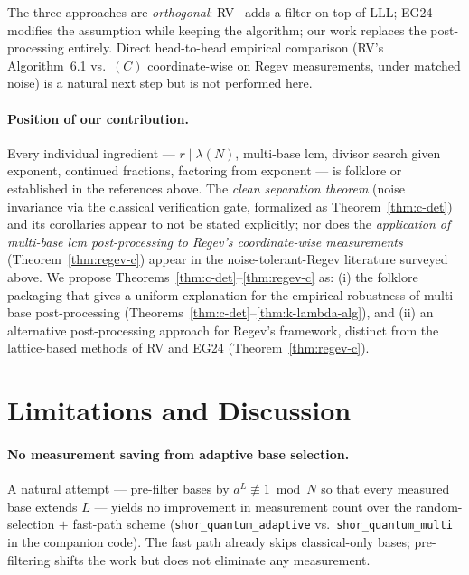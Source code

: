\documentclass[11pt]{article}
\begin{document}
The three approaches are \emph{orthogonal}: RV~\cite{ragavan2023} adds a filter on top of LLL; EG24~\cite{ekeragartner2024} modifies the assumption while keeping the algorithm; our work replaces the post-processing entirely. Direct head-to-head empirical comparison (RV's Algorithm~6.1 vs.\ $(C)$ coordinate-wise on Regev measurements, under matched noise) is a natural next step but is not performed here.

\paragraph{Position of our contribution.}
Every individual ingredient --- $r \mid \lambda(N)$, multi-base lcm, divisor search given exponent, continued fractions, factoring from exponent --- is folklore or established in the references above. The \emph{clean separation theorem} (noise invariance via the classical verification gate, formalized as Theorem~\ref{thm:c-det}) and its corollaries appear to not be stated explicitly; nor does the \emph{application of multi-base lcm post-processing to Regev's coordinate-wise measurements} (Theorem~\ref{thm:regev-c}) appear in the noise-tolerant-Regev literature surveyed above. We propose Theorems~\ref{thm:c-det}--\ref{thm:regev-c} as: (i) the folklore packaging that gives a uniform explanation for the empirical robustness of multi-base post-processing (Theorems~\ref{thm:c-det}--\ref{thm:k-lambda-alg}), and (ii) an alternative post-processing approach for Regev's framework, distinct from the lattice-based methods of RV and EG24 (Theorem~\ref{thm:regev-c}).

\section{Limitations and Discussion}
\label{sec:limitations}

\paragraph{No measurement saving from adaptive base selection.}
A natural attempt --- pre-filter bases by $a^L \not\equiv 1 \bmod N$ so that every measured base extends $L$ --- yields no improvement in measurement count over the random-selection $+$ fast-path scheme (\texttt{shor\_quantum\_adaptive} vs.\ \texttt{shor\_quantum\_multi} in the companion code). The fast path already skips classical-only bases; pre-filtering shifts the work but does not eliminate any measurement.
\end{document}
